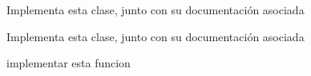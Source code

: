 
\begin{DoxyRefList}
\item[\label{todo__todo000003}%
\hypertarget{todo__todo000003}{}%
Clase \hyperlink{classconjunto}{conjunto} ]Implementa esta clase, junto con su documentación asociada  
\item[\label{todo__todo000002}%
\hypertarget{todo__todo000002}{}%
Clase \hyperlink{classcrimen}{crimen} ]Implementa esta clase, junto con su documentación asociada 
\item[\label{todo__todo000004}%
\hypertarget{todo__todo000004}{}%
Miembro \hyperlink{conjunto_8h_ae54b721035471d372f29c0335c42734a}{operator$<$$<$} (ostream \&sal, const conjunto \&D)]implementar esta funcion 
\end{DoxyRefList}